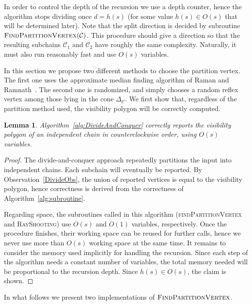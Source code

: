 \documentclass[a4paper]{article}
\newtheorem{lemma}{Lemma}
\newcommand{\coneC}{\ensuremath{{{\Delta_{\mathcal C}}}}}
\begin{document}
In order to control the depth of the recursion we use a depth counter, hence the algorithm stops dividing once $d=h(s)$ (for some value $h(s)\in O(s)$ that will be determined later). Note that the split direction is decided by subroutine $\textsc{FindPartitionVertex}(\mathcal C)$. This procedure should give a direction so that the resulting subchains ${\mathcal C_1}$ and ${\mathcal C_2}$ have roughly the same complexity. Naturally, it must also run reasonably fast and use $O(s)$ variables.

In this section we propose two different methods to choose the partition vertex. The first one uses the approximate median finding algorithm of  Raman and Ramnath~\cite{rr-iubtstsls-98}. The second one is randomized, and simply chooses a random reflex vertex among those lying in the cone $\coneC$. We first show that, regardless of the partition method used, the visibility polygon will be correctly computed. 

\begin{lemma}\label{lem_correctdiv}
Algorithm~\ref{alg:DivideAndConquer} correctly reports the visibility polygon of an independent chain in counterclockwise order, using $O(s)$ variables.
\end{lemma}
\begin{proof}
The divide-and-conquer approach repeatedly partitions the input into independent chains. Each subchain will eventually be reported. By Observation~\ref{DivideObs}, the union of reported vertices is equal to the visibility polygon, hence correctness is derived from the correctness of  Algorithm~\ref{alg:subroutine}.





Regarding space, the subroutines called in this algorithm (\textsc{findPartitionVertex} and \linebreak\textsc{RayShooting}) use $O(s)$ and $O(1)$ variables, respectively. Once the procedure finishes, their working space can be reused for further calls, hence we never use more than $O(s)$ working space at the same time. It remains to consider the memory used implicitly for handling the recursion. Since each step of the algorithm needs a constant number of variables, the total memory needed will be proportional to the recursion depth. Since $h(s)\in O(s)$, the claim is shown.
\end{proof}

In what follows we present two implementations of $\textsc{FindPartitionVertex}$. 
\end{document}
